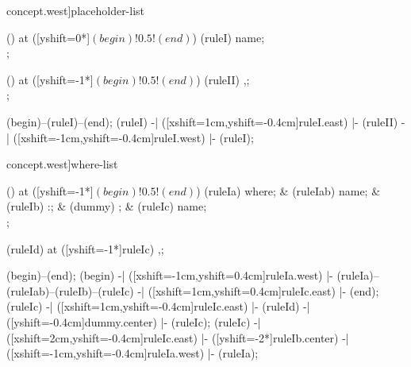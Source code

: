 \begin{syntax}[[xshift=32mm]concept.west]{placeholder-list}
  
  \node[sequence] () at ([yshift=0*\syntaxruledist]$(begin)!0.5!(end)$) {
    \node[nonterminal] (ruleI) {name};
    \\
  };
  
  \node[sequence] () at ([yshift=-1*\syntaxruledist]$(begin)!0.5!(end)$) {
    \node[terminal]    (ruleII) {,};
    \\
  };
  
  \draw[path] (begin)--(ruleI)--(end);
  \draw[path] (ruleI)
           -| ([xshift=1cm,yshift=-0.4cm]ruleI.east)
           |- (ruleII)
           -| ([xshift=-1cm,yshift=-0.4cm]ruleI.west)
           |- (ruleI);
\end{syntax}

\begin{syntax}[[xshift=32mm]concept.west]{where-list}
  
  \node[sequence] () at ([yshift=-1*\syntaxruledist]$(begin)!0.5!(end)$) {
    \node[terminal]    (ruleIa) {where};
    &
    \node[nonterminal] (ruleIab) {name};
    &
    \node[terminal]    (ruleIb) {:};
    &
    \node[]            (dummy) {};
    &
    \node[nonterminal] (ruleIc) {name};
    \\
  };
  
  \node[terminal]    (ruleId) at ([yshift=-1*\syntaxruledist]ruleIc) {,};
  
  \draw[path] (begin)--(end);
  \draw[path] (begin)
           -| ([xshift=-1cm,yshift=0.4cm]ruleIa.west)
           |- (ruleIa)--(ruleIab)--(ruleIb)--(ruleIc)
           -| ([xshift=1cm,yshift=0.4cm]ruleIc.east)
           |- (end);
  \draw[path] (ruleIc)
           -| ([xshift=1cm,yshift=-0.4cm]ruleIc.east)
           |- (ruleId)
           -| ([yshift=-0.4cm]dummy.center)
           |- (ruleIc);
  \draw[path] (ruleIc)
           -| ([xshift=2cm,yshift=-0.4cm]ruleIc.east)
           |- ([yshift=-2*\syntaxruledist]ruleIb.center)
           -| ([xshift=-1cm,yshift=-0.4cm]ruleIa.west)
           |- (ruleIa);
\end{syntax}

